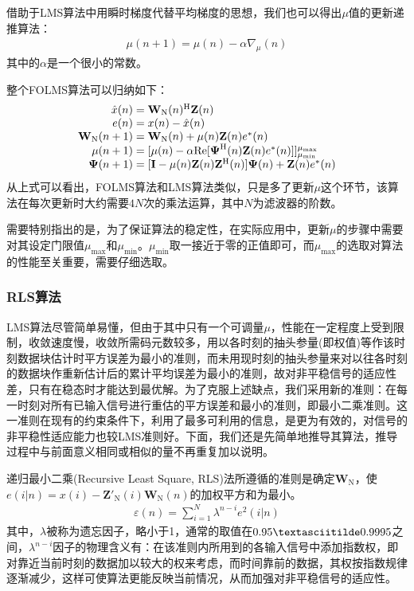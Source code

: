 借助于LMS算法中用瞬时梯度代替平均梯度的思想，我们也可以得出$\mu$值的更新递推算法：
\begin{eqnarray}
    \mu(n+1)=\mu(n)-\alpha\nabla_{\mu}(n)
    \label{equ:2.22}
\end{eqnarray}
其中的$\alpha$是一个很小的常数。

整个FOLMS算法可以归纳如下：
\begin{eqnarray}
    \begin{array}{r@{\;=\;}l}
        \hat{x}(n)&\mathbf{W}_{\mathrm{N}}(n)^{\mathrm{H}}\mathbf{Z}(n)\\
        e(n)&x(n)-\hat{x}(n)\\
        \mathbf{W}_{\mathrm{N}}(n+1)&\mathbf{W}_{\mathrm{N}}(n)+\mu(n)\mathbf{Z}(n)e^*(n)\\
        \mu(n+1)&[\mu(n)-\alpha\mathrm{Re}[\boldsymbol{\Psi}^{\mathrm{H}}(n)\mathbf{Z}(n)e^*(n)]]_{\mu_{\mathrm{min}}}^{\mu_{\mathrm{max}}}\\
        \boldsymbol{\Psi}(n+1)&[\mathbf{I}-\mu(n)\mathbf{Z}(n)\mathbf{Z}^{\mathrm{H}}(n)]\boldsymbol{\Psi}(n)+\mathbf{Z}(n)e^*(n)
    \end{array}
    \label{equ:2.23}
\end{eqnarray}
从上式可以看出，FOLMS算法和LMS算法类似，只是多了更新$\mu$这个环节，该算法在每次更新时大约需要$4N$次的乘法运算，其中$N$为滤波器的阶数。

需要特别指出的是，为了保证算法的稳定性，在实际应用中，更新$\mu$的步骤中需要对其设定门限值$\mu_{\mathrm{max}}$和$\mu_{\mathrm{min}}$。$\mu_{\mathrm{min}}$取一接近于零的正值即可，而$\mu_{\mathrm{max}}$的选取对算法的性能至关重要，需要仔细选取\citep{Geller1996}。
\subsubsection*{RLS算法}
LMS算法尽管简单易懂，但由于其中只有一个可调量$\mu$，性能在一定程度上受到限制，收敛速度慢，收敛所需码元数较多，用以各时刻的抽头参量(即权值)等作该时刻数据块估计时平方误差为最小的准则，而未用现时刻的抽头参量来对以往各时刻的数据块作重新估计后的累计平均误差为最小的准则，故对非平稳信号的适应性差，只有在稳态时才能达到最优解。为了克服上述缺点，我们采用新的准则：在每一时刻对所有已输入信号进行重估的平方误差和最小的准则，即最小二乘准则。这一准则在现有的约束条件下，利用了最多可利用的信息，是更为有效的，对信号的非平稳性适应能力也较LMS准则好。下面，我们还是先简单地推导其算法，推导过程中与前面意义相同或相似的量不再重复加以说明。

递归最小二乘(Recursive Least Square,
RLS)法所遵循的准则是确定$\mathbf{W}_{\mathrm{N}}$，使$e(i|n)=x(i)-{\mathbf{Z}}'_{\mathrm{N}}(i)\mathbf{W}_{\mathrm{N}}(n)$的加权平方和为最小。
\begin{eqnarray}
    \varepsilon(n)=\sum_{i=1}^N\lambda^{n-i}e^2(i|n)
    \label{equ:2.24}
\end{eqnarray}
其中，$\lambda$被称为遗忘因子，略小于1，通常的取值在$0.95\textasciitilde
0.9995$之间，$\lambda^{n-i}$因子的物理含义有：在该准则内所用到的各输入信号中添加指数权，即对靠近当前时刻的数据加以较大的权来考虑，而时间靠前的数据，其权按指数规律逐渐减少，这样可使算法更能反映当前情况，从而加强对非平稳信号的适应性。

